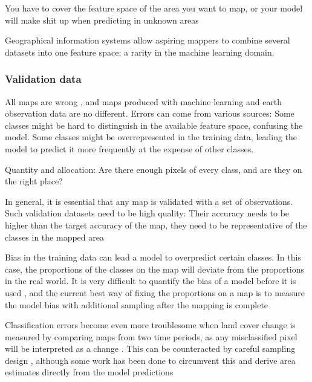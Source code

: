        You have to cover the feature space of the area you want to map, or your model will make shit up when predicting in unknown areas \citep{meyer2021predicting}

        Geographical information systems allow aspiring mappers to combine several datasets into one feature space; a rarity in the machine learning domain.

    \subsubsection*{Validation data}

        All maps are wrong \citep{monmonier2018how}, and maps produced with machine learning and earth observation data are no different. Errors can come from various sources: Some classes might be hard to distinguish in the available feature space, confusing the model. Some classes might be overrepresented in the training data, leading the model to predict it more frequently at the expense of other classes. 

        Quantity and allocation: Are there enough pixels of every class, and are they on the right place? \citep{pontius2006can,pontius2011death}

        In general, it is essential that any map is validated with a set of observations. Such validation datasets need to be high quality: Their accuracy needs to be higher than the target accuracy of the map, they need to be representative of the classes in the mapped area 
    
        Bias in the training data can lead a model to overpredict certain classes. In this case, the proportions of the classes on the map will deviate from the proportions in the real world. It is very difficult to quantify the bias of a model before it is used \citep{stehman2013estimating}, and the current best way of fixing the proportions on a map is to measure the model bias with additional sampling after the mapping is complete \citep{stehman2014estimating}

        Classification errors become even more troublesome when land cover change is measured by comparing maps from two time periods, as any misclassified pixel will be interpreted as a change \citep{olofsson2013making}. This can be counteracted by careful sampling design \citep{stehman2012impact,olofsson2014good}, although some work has been done to circumvent this and derive area estimates directly from the model predictions \citep{sales2022land}
    
